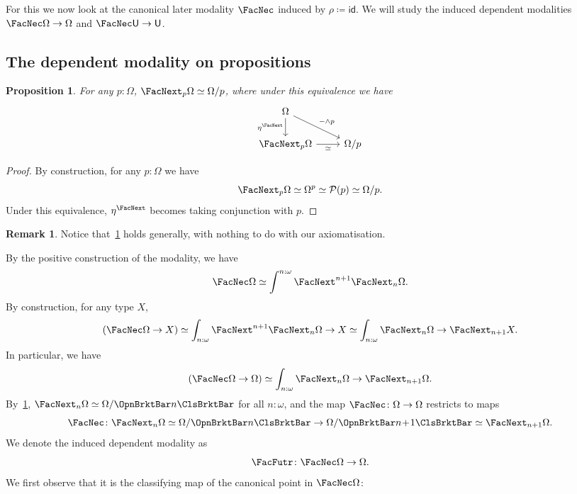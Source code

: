 \documentclass[a4paper,10pt]{amsart}
\newtheorem{lemma}{Lemma}[section]
\newtheorem{proposition}{Proposition}[section]
\theoremstyle{definition}
\newtheorem{remark}{Remark}[section]
\newcommand{\mc}[1]{\mathcal{#1}}
\newcommand{\ms}[1]{\mathsf{#1}}
\newcommand{\set}[1]{\{\,#1\,\}}
\newcommand{\id}{\mathsf{id}}
\newcommand{\ass}[1]{\OpnBrktBar#1\ClsBrktBar}
\newcommand{\bx}{\FacNec}
\newcommand{\Type}{\ms U}
\newcommand{\Prop}{\Omega}
\newcommand{\plo}{\!+\!1}
\newcommand{\opm}[1]{\FacNext_{#1}}
\newcommand{\upm}[1]{\FacNext^{#1}}
\newcommand{\opmm}{\FacNext}
\newcommand{\later}{\FacFutr}
\begin{document}
For this we now look at the canonical later modality $\bx$ induced by $\rho \coloneq \id$. We will study the induced dependent modalities $\bx\Prop \to \Prop$ and $\bx\Type \to \Type$. 




\subsection{The dependent modality on propositions}

\begin{proposition}\label{openmodofprop}
  For any $p:\Prop$, $\opm p\Prop \simeq \Prop/p$, where under this equivalence we have
  \[
  \begin{tikzcd}
    \Prop \ar[d, "\eta^\opmm"'] \ar[dr, "-\wedge p"] \\ 
    \opm p\Prop \ar[r, "\simeq"'] & \Prop/p
  \end{tikzcd}
  \]
\end{proposition}
\begin{proof}
  By construction, for any $p:\Prop$ we have 
  \[ \opm p\Prop \simeq \Prop^p \simeq \mc P(p) \simeq \Prop/p. \]
  Under this equivalence, $\eta^\opmm$ becomes taking conjunction with $p$. 
\end{proof}

\begin{remark}
  Notice that~\cref{openmodofprop} holds generally, with nothing to do with our axiomatisation.
\end{remark}

By the positive construction of the modality, we have 
\[ \bx\Prop \simeq \int^{n:\omega}\upm{n+1}\opm n\Prop. \]
By construction, for any type $X$,
\[ (\bx\Omega \to X) \simeq \int_{n:\omega} \upm{n+1}\opm{n}\Prop \to X \simeq \int_{n:\omega} \opm n\Prop \to \opm{n+1}X. \]
In particular, we have
\[ (\bx\Prop \to \Prop) \simeq \int_{n:\omega}\opm n\Prop \to \opm{n+1}\Prop. \]
By~\cref{openmodofprop}, $\opm n\Prop \simeq \Prop/\ass n$ for all $n:\omega$, and the map $\bx \colon \Prop \to \Prop$ restricts to maps 
\[ \bx \colon \opm n\Prop \simeq \Prop/\ass n \to \Prop/\ass{n\plo} \simeq \opm{n+1}\Prop. \]
We denote the induced dependent modality as
\[ \later \colon \bx\Prop \to \Prop. \]
We first observe that it is the classifying map of the canonical point in $\bx\Prop$:
\end{document}
